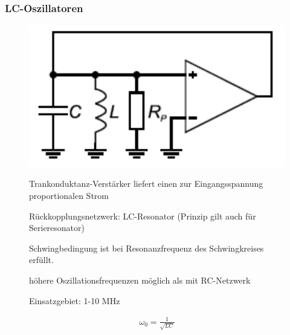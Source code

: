 \subsubsection{LC-Oszillatoren}
\begin{figure}[h!]
	\begin{minipage}{0.3\textwidth} 
	\includegraphics[width=1\textwidth]{images/LC-Oszillator}
	\end{minipage}
	\begin{minipage}{0.6\textwidth}
      \begin{compactitem}
        \item Trankonduktanz-Verstärker liefert einen zur Eingangsspannung proportionalen Strom
        \item Rückkopplungsnetzwerk: LC-Resonator (Prinzip gilt auch für Serieresonator) 
        \item Schwingbedingung ist bei Resonanzfrequenz des Schwingkreises erfüllt.
        \item höhere Oszillationsfrequenzen möglich als mit RC-Netzwerk
        \item Einsatzgebiet: 1-10 MHz
      \end{compactitem}
       \begin{equation*} 
        \begin{split} 
          \omega_0=\frac{1}{\sqrt{LC}}
        \end{split} 
      \end{equation*}
	\end{minipage}
\end{figure}

\FloatBarrier
